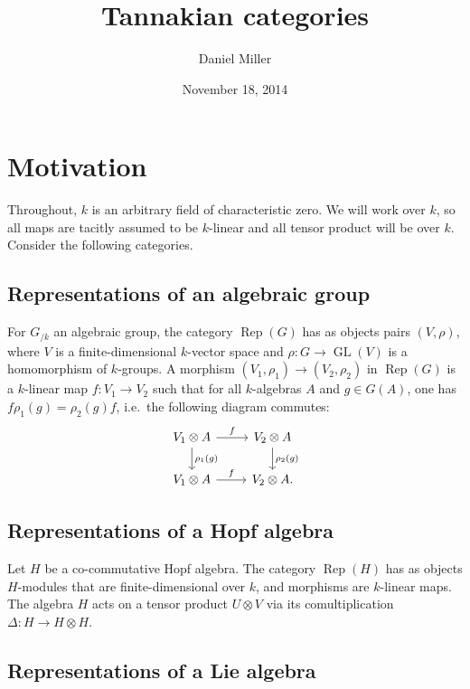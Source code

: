 \documentclass{article}
\title{Tannakian categories}
\author{Daniel Miller}
\date{November 18, 2014}
\DeclareMathOperator{\GL}{GL}
\DeclareMathOperator{\rep}{Rep}
\begin{document}
\maketitle





\section{Motivation}\label{sec:examples}

Throughout, $k$ is an arbitrary field of characteristic zero. We will work over 
$k$, so all maps are tacitly assumed to be $k$-linear and all tensor product 
will be over $k$. Consider the following categories. 


\subsection{Representations of an algebraic group}\label{sec:rep-gp}

For $G_{/k}$ an algebraic group, the category $\rep(G)$ has as objects pairs 
$(V,\rho)$, where $V$ is a finite-dimensional $k$-vector space and 
$\rho:G\to \GL(V)$ is a homomorphism of $k$-groups. A morphism 
$(V_1,\rho_1)\to (V_2,\rho_2)$ in $\rep(G)$ is a $k$-linear map 
$f:V_1\to V_2$ such that for all $k$-algebras $A$ and $g\in G(A)$, one has 
$f \rho_1(g) = \rho_2(g)  f$, i.e.~the following diagram commutes:
\[
\begin{tikzcd}
  V_1\otimes A \ar[r, "f"] \ar[d, "\rho_1(g)"] 
    & V_2\otimes A \ar[d, "\rho_2(g)"] \\
  V_1\otimes A \ar[r, "f"]
    & V_2\otimes A .
\end{tikzcd}
\]


\subsection{Representations of a Hopf algebra}\label{sec:rep-alg}

Let $H$ be a co-commutative Hopf algebra. The category $\rep(H)$ has as objects 
$H$-modules that are finite-dimensional over $k$, and morphisms are 
$k$-linear maps. The algebra $H$ acts on a tensor product $U\otimes V$ via 
its comultiplication $\Delta:H\to H\otimes H$. 


\subsection{Representations of a Lie algebra}\label{sec:rep-liealg}
\end{document}
